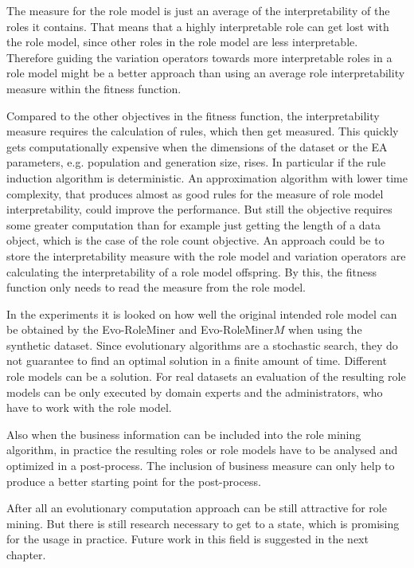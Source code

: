 	The measure for the role model is just an average of the interpretability of the roles it contains. That means that a highly interpretable role can get lost with the role model, since other roles in the role model are less interpretable. Therefore guiding the variation operators towards more interpretable roles in a role model might be a better approach than using an average role interpretability measure within the fitness function.
	
	Compared to the other objectives in the fitness function, the interpretability measure requires the calculation of rules, which then get measured. This quickly gets computationally expensive when the dimensions of the dataset or the EA parameters, e.g. population and generation size, rises. In particular if the rule induction algorithm is deterministic. An approximation algorithm with lower time complexity, that produces almost as good rules for the measure of role model interpretability, could improve the performance. But still the objective requires some greater computation than for example just getting the length of a data object, which is the case of the role count objective. An approach could be to store the interpretability measure with the role model and variation operators are calculating the interpretability of a role model offspring. By this, the fitness function only needs to read the measure from the role model.
	
	In the experiments it is looked on how well the original intended role model can be obtained by the Evo-RoleMiner and Evo-RoleMiner$M$ when using the synthetic dataset. Since evolutionary algorithms are a stochastic search, they do not guarantee to find an optimal solution in a finite amount of time. Different role models can be a solution. For real datasets an evaluation of the resulting role models can be only executed by domain experts and the administrators, who have to work with the role model.
	
	Also when the business information can be included into the role mining algorithm, in practice the resulting roles or role models have to be analysed and optimized in a post-process. The inclusion of business measure can only help to produce a better starting point for the post-process.

\hfill \break
After all an evolutionary computation approach can be still attractive for role mining. But there is still research necessary to get to a state, which is promising for the usage in practice. Future work in this field is suggested in the next chapter.